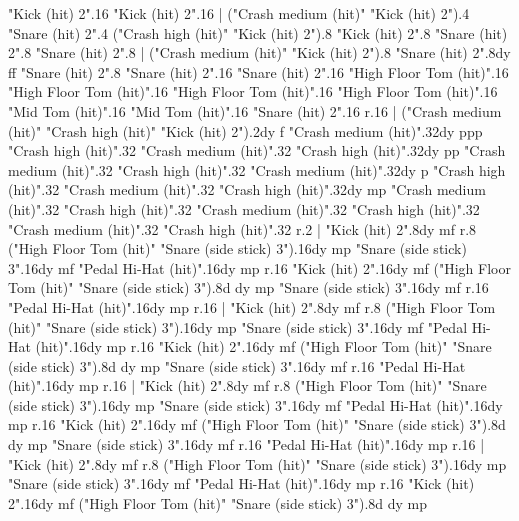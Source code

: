       "Kick (hit) 2".16
      "Kick (hit) 2".16
    |
      ("Crash medium (hit)" "Kick (hit) 2").4
      "Snare (hit) 2".4
      ("Crash high (hit)" "Kick (hit) 2").8
      "Kick (hit) 2".8
      "Snare (hit) 2".8
      "Snare (hit) 2".8
    |
      ("Crash medium (hit)" "Kick (hit) 2").8
      "Snare (hit) 2".8{dy ff}
      "Snare (hit) 2".8
      "Snare (hit) 2".16
      "Snare (hit) 2".16
      "High Floor Tom (hit)".16
      "High Floor Tom (hit)".16
      "High Floor Tom (hit)".16
      "High Floor Tom (hit)".16
      "Mid Tom (hit)".16
      "Mid Tom (hit)".16
      "Snare (hit) 2".16
      r.16
    |
      ("Crash medium (hit)" "Crash high (hit)" "Kick (hit) 2").2{dy f}
      "Crash medium (hit)".32{dy ppp}
      "Crash high (hit)".32
      "Crash medium (hit)".32
      "Crash high (hit)".32{dy pp}
      "Crash medium (hit)".32
      "Crash high (hit)".32
      "Crash medium (hit)".32{dy p}
      "Crash high (hit)".32
      "Crash medium (hit)".32
      "Crash high (hit)".32{dy mp}
      "Crash medium (hit)".32
      "Crash high (hit)".32
      "Crash medium (hit)".32
      "Crash high (hit)".32
      "Crash medium (hit)".32
      "Crash high (hit)".32
      r.2
    |
      "Kick (hit) 2".8{dy mf}
      r.8
      ("High Floor Tom (hit)" "Snare (side stick) 3").16{dy mp}
      "Snare (side stick) 3".16{dy mf}
      "Pedal Hi-Hat (hit)".16{dy mp}
      r.16
      "Kick (hit) 2".16{dy mf}
      ("High Floor Tom (hit)" "Snare (side stick) 3").8{d dy mp}
      "Snare (side stick) 3".16{dy mf}
      r.16
      "Pedal Hi-Hat (hit)".16{dy mp}
      r.16
    |
      "Kick (hit) 2".8{dy mf}
      r.8
      ("High Floor Tom (hit)" "Snare (side stick) 3").16{dy mp}
      "Snare (side stick) 3".16{dy mf}
      "Pedal Hi-Hat (hit)".16{dy mp}
      r.16
      "Kick (hit) 2".16{dy mf}
      ("High Floor Tom (hit)" "Snare (side stick) 3").8{d dy mp}
      "Snare (side stick) 3".16{dy mf}
      r.16
      "Pedal Hi-Hat (hit)".16{dy mp}
      r.16
    |
      "Kick (hit) 2".8{dy mf}
      r.8
      ("High Floor Tom (hit)" "Snare (side stick) 3").16{dy mp}
      "Snare (side stick) 3".16{dy mf}
      "Pedal Hi-Hat (hit)".16{dy mp}
      r.16
      "Kick (hit) 2".16{dy mf}
      ("High Floor Tom (hit)" "Snare (side stick) 3").8{d dy mp}
      "Snare (side stick) 3".16{dy mf}
      r.16
      "Pedal Hi-Hat (hit)".16{dy mp}
      r.16
    |
      "Kick (hit) 2".8{dy mf}
      r.8
      ("High Floor Tom (hit)" "Snare (side stick) 3").16{dy mp}
      "Snare (side stick) 3".16{dy mf}
      "Pedal Hi-Hat (hit)".16{dy mp}
      r.16
      "Kick (hit) 2".16{dy mf}
      ("High Floor Tom (hit)" "Snare (side stick) 3").8{d dy mp}
